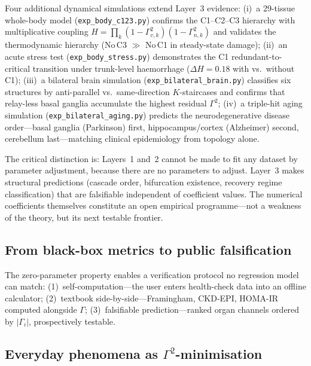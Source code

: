 \documentclass[aps,pre,twocolumn,superscriptaddress,floatfix]{revtex4-2}
\begin{document}
\begin{remark}
\begin{enumerate}
    Four additional dynamical simulations extend
    Layer~3 evidence:
    (i)~a 29-tissue whole-body model
    (\texttt{exp\_body\_c123.py}) confirms the
    C1--C2--C3 hierarchy with multiplicative
    coupling $H = \prod_k(1-\Gamma_{v,k}^2)
    (1-\Gamma_{n,k}^2)$ and validates the
    thermodynamic hierarchy
    (No\,C3 $\gg$ No\,C1 in steady-state damage);
    (ii)~an acute stress test
    (\texttt{exp\_body\_stress.py}) demonstrates
    the C1 redundant-to-critical transition
    under trunk-level haemorrhage
    ($\Delta H = 0.18$ with vs.\ without C1);
    (iii)~a bilateral brain simulation
    (\texttt{exp\_bilateral\_brain.py})
    classifies six structures by anti-parallel
    vs.\ same-direction $K$-staircases and
    confirms that relay-less basal ganglia
    accumulate the highest residual $\Gamma^2$;
    (iv)~a triple-hit aging simulation
    (\texttt{exp\_bilateral\_aging.py}) predicts
    the neurodegenerative disease order---basal
    ganglia (Parkinson) first, hippocampus/cortex
    (Alzheimer) second, cerebellum last---matching
    clinical epidemiology from topology alone.
\end{enumerate}
The critical distinction is: Layers~1 and~2
cannot be made to fit any dataset by parameter
adjustment, because there are no parameters to
adjust.
Layer~3 makes structural predictions
(cascade order, bifurcation existence,
recovery regime classification)
that are falsifiable independent of coefficient
values.
The numerical coefficients themselves constitute
an open empirical programme---not a weakness of
the theory, but its next testable frontier.
\end{remark}

\subsection{From black-box metrics to public falsification}

The zero-parameter property enables a verification protocol
no regression model can match: (1)~self-computation---the
user enters health-check data into an offline calculator;
(2)~textbook side-by-side---Framingham, CKD-EPI, HOMA-IR
computed alongside $\Gamma$; (3)~falsifiable
prediction---ranked organ channels ordered by $|\Gamma_i|$,
prospectively testable.

\subsection{Everyday phenomena as $\Gamma^2$-minimisation}
\end{document}
